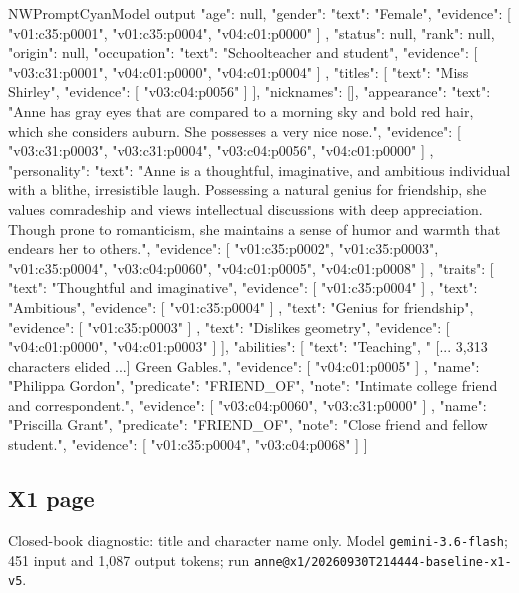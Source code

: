 \begin{nwprompt}{NWPromptCyan}{Model output}
{
  "age": null,
  "gender": {
    "text": "Female",
    "evidence": [
      "v01:c35:p0001",
      "v01:c35:p0004",
      "v04:c01:p0000"
    ]
  },
  "status": null,
  "rank": null,
  "origin": null,
  "occupation": {
    "text": "Schoolteacher and student",
    "evidence": [
      "v03:c31:p0001",
      "v04:c01:p0000",
      "v04:c01:p0004"
    ]
  },
  "titles": [
    {
      "text": "Miss Shirley",
      "evidence": [
        "v03:c04:p0056"
      ]
    }
  ],
  "nicknames": [],
  "appearance": {
    "text": "Anne has gray eyes that are compared to a morning sky and bold red hair, which she considers auburn. She possesses a very nice nose.",
    "evidence": [
      "v03:c31:p0003",
      "v03:c31:p0004",
      "v03:c04:p0056",
      "v04:c01:p0000"
    ]
  },
  "personality": {
    "text": "Anne is a thoughtful, imaginative, and ambitious individual with a blithe, irresistible laugh. Possessing a natural genius for friendship, she values comradeship and views intellectual discussions with deep appreciation. Though prone to romanticism, she maintains a sense of humor and warmth that endears her to others.",
    "evidence": [
      "v01:c35:p0002",
      "v01:c35:p0003",
      "v01:c35:p0004",
      "v03:c04:p0060",
      "v04:c01:p0005",
      "v04:c01:p0008"
    ]
  },
  "traits": [
    {
      "text": "Thoughtful and imaginative",
      "evidence": [
        "v01:c35:p0004"
      ]
    },
    {
      "text": "Ambitious",
      "evidence": [
        "v01:c35:p0004"
      ]
    },
    {
      "text": "Genius for friendship",
      "evidence": [
        "v01:c35:p0003"
      ]
    },
    {
      "text": "Dislikes geometry",
      "evidence": [
        "v04:c01:p0000",
        "v04:c01:p0003"
      ]
    }
  ],
  "abilities": [
    {
      "text": "Teaching",
      "
[... 3,313 characters elided ...]
 Green Gables.",
      "evidence": [
        "v04:c01:p0005"
      ]
    },
    {
      "name": "Philippa Gordon",
      "predicate": "FRIEND_OF",
      "note": "Intimate college friend and correspondent.",
      "evidence": [
        "v03:c04:p0060",
        "v03:c31:p0000"
      ]
    },
    {
      "name": "Priscilla Grant",
      "predicate": "FRIEND_OF",
      "note": "Close friend and fellow student.",
      "evidence": [
        "v01:c35:p0004",
        "v03:c04:p0068"
      ]
    }
  ]
}
\end{nwprompt}

\subsection*{X1 page}
Closed-book diagnostic: title and character name only. Model \texttt{gemini-3.6-flash}; 451 input and 1,087 output tokens; run \nolinkurl{anne@x1/20260930T214444-baseline-x1-v5}.

